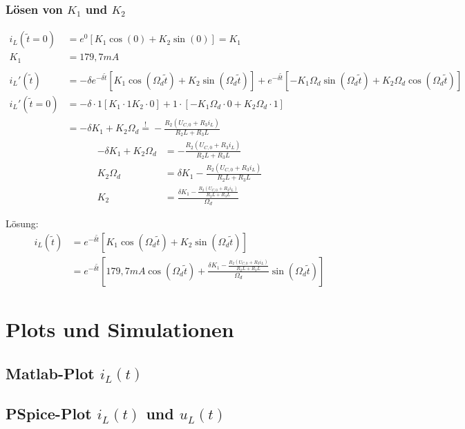 \documentclass[11pt]{scrartcl}
\begin{document}
\subsubsection{Lösen von $K_1$ und $K_2$}%
\begin{align*}
  i_{L}(\tilde{t} = 0) &= e^{0} \left[ K_{1} \cos(0) + K_{2} \sin(0)\right] = K_{1} \\
  K_{1} &= 179,7 \unit{mA} \\ \\
  i_{L}'(\tilde{t}) &= -\delta e^{-\delta \tilde{t}} \left[ K_{1} \cos(\Omega_{d} \tilde{t}) + K_{2} \sin(\Omega_{d} \tilde{t})\right] + e^{-\delta \tilde{t}} \left[ -K_{1} \Omega_{d} \sin(\Omega_{d} \tilde{t}) + K_{2} \Omega_{d} \cos(\Omega_{d} \tilde{t})\right] \\
  i_{L}'(\tilde{t}=0) &= -\delta\cdot 1 \left[ K_{1}\cdot 1 K_{2} \cdot 0\right] + 1 \cdot \left[ -K_{1}\Omega_{d} \cdot 0 + K_{2} \Omega_{d} \cdot 1\right] \\
  &= -\delta K_{1} + K_{2}\Omega_{d} \overset{!}{=} - \frac{R_{2} (U_{C,0} + R_{3} i_{L})}{R_{2}L + R_{3}L}
\end{align*}
\begin{align*}
  -\delta K_{1} + K_{2}\Omega_{d} &= - \frac{R_{2} (U_{C,0} + R_{3} i_{L})}{R_{2}L + R_{3}L} \\
  K_{2}\Omega_{d} &= \delta K_{1} - \frac{R_{2}(U_{C,0} + R_{3}i_{L})}{R_{2}L + R_{3}L} \\
  K_{2} &= \frac{\delta K_{1} - \frac{R_{2}(U_{C,0} + R_{3} i_{L})}{R_{2}L + R_{3}L}}{\Omega_{d}}
\end{align*}

Lösung:
\begin{align*}
  i_{L}(\tilde{t}) &= e^{-\delta \tilde{t}}\left[ K_{1} \cos(\Omega_{d} \tilde{t}) + K_{2} \sin(\Omega_{d} \tilde{t}) \right] \\
  &= e^{-\delta \tilde{t}}\left[ 179,7 \unit{mA} \cos(\Omega_{d} \tilde{t}) + \frac{\delta K_{1} - \frac{R_{2}(U_{C,0} + R_{3} i_{L})}{R_{2}L + R_{3}L}}{\Omega_{d}} \sin(\Omega_{d} \tilde{t}) \right]
\end{align*}
\section{Plots und Simulationen} %
\subsection{Matlab-Plot $i_L(t)$} %
\subsection{PSpice-Plot $i_L(t)$ und $u_L(t)$} %
\end{document}
